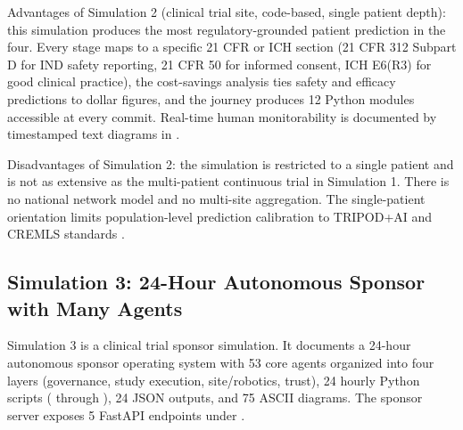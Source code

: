Advantages of Simulation 2 (clinical trial site, code-based, single
patient depth): this simulation produces the most regulatory-grounded
patient prediction in the four. Every stage maps to a specific 21 CFR
or ICH section (21 CFR 312 Subpart D for IND safety reporting, 21 CFR
50 for informed consent, ICH E6(R3) for good clinical practice), the
cost-savings analysis ties safety and efficacy predictions to dollar
figures, and the journey produces 12 Python modules accessible at
every commit. Real-time human monitorability is documented by
timestamped text diagrams in .

Disadvantages of Simulation 2: the simulation is restricted to a
single patient and is not as extensive as the multi-patient continuous
trial in Simulation 1. There is no national network model and no
multi-site aggregation. The single-patient orientation limits
population-level prediction calibration to TRIPOD+AI and CREMLS
standards \cite{Collins2024TRIPODAI, ElEmam2024CREMLS}.

\subsection{Simulation 3: 24-Hour Autonomous Sponsor with Many Agents}
\label{sec:results-sim3}

Simulation 3 is a clinical trial sponsor simulation. It documents a
24-hour autonomous sponsor operating system with 53 core agents
organized into four layers (governance, study execution,
site/robotics, trust), 24 hourly Python scripts
( through ), 24
JSON outputs, and 75 ASCII diagrams. The sponsor server exposes 5
FastAPI endpoints under
\cite{kawchak_2026_19396256}.

